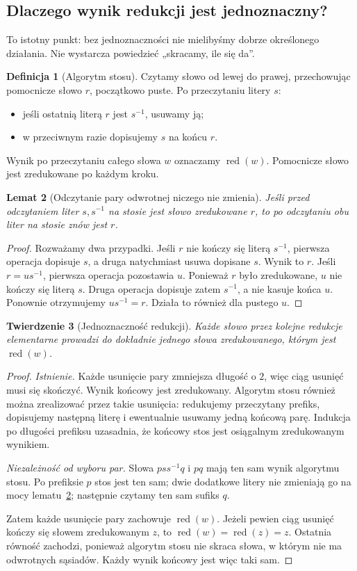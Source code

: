 \documentclass[11pt,a4paper]{article}
\numberwithin{equation}{section}
\theoremstyle{plain}
\newtheorem{twierdzenie}{Twierdzenie}[section]
\newtheorem{lemat}[twierdzenie]{Lemat}
\theoremstyle{definition}
\newtheorem{definicja}[twierdzenie]{Definicja}
\theoremstyle{remark}
\newcommand{\red}{\operatorname{red}}
\begin{document}
\subsection{Dlaczego wynik redukcji jest jednoznaczny?}
To istotny punkt: bez jednoznaczności nie mielibyśmy dobrze określonego działania. Nie wystarcza powiedzieć „skracamy, ile się da”.
\begin{definicja}[Algorytm stosu]
Czytamy słowo od lewej do prawej, przechowując pomocnicze słowo $r$, początkowo puste. Po przeczytaniu litery $s$:
\begin{itemize}
\item jeśli ostatnią literą $r$ jest $s^{-1}$, usuwamy ją;
\item w przeciwnym razie dopisujemy $s$ na końcu $r$.
\end{itemize}
Wynik po przeczytaniu całego słowa $w$ oznaczamy $\red(w)$. Pomocnicze słowo jest zredukowane po każdym kroku.
\end{definicja}
\begin{lemat}[Odczytanie pary odwrotnej niczego nie zmienia]\label{lem:stos}
Jeśli przed odczytaniem liter $s,s^{-1}$ na stosie jest słowo zredukowane $r$, to po odczytaniu obu liter na stosie znów jest $r$.
\end{lemat}
\begin{proof}
Rozważamy dwa przypadki. Jeśli $r$ nie kończy się literą $s^{-1}$, pierwsza operacja dopisuje $s$, a druga natychmiast usuwa dopisane $s$. Wynik to $r$. Jeśli $r=us^{-1}$, pierwsza operacja pozostawia $u$. Ponieważ $r$ było zredukowane, $u$ nie kończy się literą $s$. Druga operacja dopisuje zatem $s^{-1}$, a nie kasuje końca $u$. Ponownie otrzymujemy $us^{-1}=r$. Działa to również dla pustego $u$.
\end{proof}
\begin{twierdzenie}[Jednoznaczność redukcji]\label{tw:redukcja}
Każde słowo przez kolejne redukcje elementarne prowadzi do dokładnie jednego słowa zredukowanego, którym jest $\red(w)$.
\end{twierdzenie}
\begin{proof}
\emph{Istnienie.} Każde usunięcie pary zmniejsza długość o $2$, więc ciąg usunięć musi się skończyć. Wynik końcowy jest zredukowany. Algorytm stosu również można zrealizować przez takie usunięcia: redukujemy przeczytany prefiks, dopisujemy następną literę i ewentualnie usuwamy jedną końcową parę. Indukcja po długości prefiksu uzasadnia, że końcowy stos jest osiągalnym zredukowanym wynikiem.

\emph{Niezależność od wyboru par.} Słowa $pss^{-1}q$ i $pq$ mają ten sam wynik algorytmu stosu. Po prefiksie $p$ stos jest ten sam; dwie dodatkowe litery nie zmieniają go na mocy lematu~\ref{lem:stos}; następnie czytamy ten sam sufiks $q$.

Zatem każde usunięcie pary zachowuje $\red(w)$. Jeżeli pewien ciąg usunięć kończy się słowem zredukowanym $z$, to $\red(w)=\red(z)=z$. Ostatnia równość zachodzi, ponieważ algorytm stosu nie skraca słowa, w którym nie ma odwrotnych sąsiadów. Każdy wynik końcowy jest więc taki sam.
\end{proof}
\end{document}
